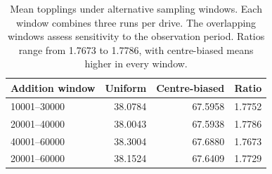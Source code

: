 \begin{table}[htbp]
\centering
\caption{Mean topplings under alternative sampling windows. Each window combines three runs per drive. The overlapping windows assess sensitivity to the observation period. Ratios range from 1.7673 to 1.7786, with centre-biased means higher in every window.}
\label{tab:sensitivity}
\begin{tabular}{@{}lrrr@{}}
\toprule
Addition window & Uniform & Centre-biased & Ratio\\
\midrule
10001--30000 & 38.0784 & 67.5958 & 1.7752\\
20001--40000 & 38.0043 & 67.5938 & 1.7786\\
40001--60000 & 38.3004 & 67.6880 & 1.7673\\
20001--60000 & 38.1524 & 67.6409 & 1.7729\\
\bottomrule
\end{tabular}
\end{table}
